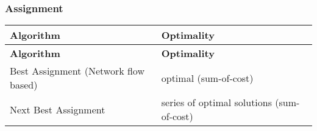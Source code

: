 \subsubsection*{Assignment}

\tabulinesep=1mm
\begin{longtabu} spread 0pt [c]{*{2}{|X[-1]}|}
\hline
\rowcolor{\tableheadbgcolor}\textbf{ Algorithm }&\textbf{ Optimality  }\\
\endfirsthead
\hline
\endfoot
\hline
\rowcolor{\tableheadbgcolor}\textbf{ Algorithm }&\textbf{ Optimality  }\\
\endhead
Best Assignment (Network flow based) &optimal (sum-\/of-\/cost) \\
Next Best Assignment &series of optimal solutions (sum-\/of-\/cost) \\
\end{longtabu}
